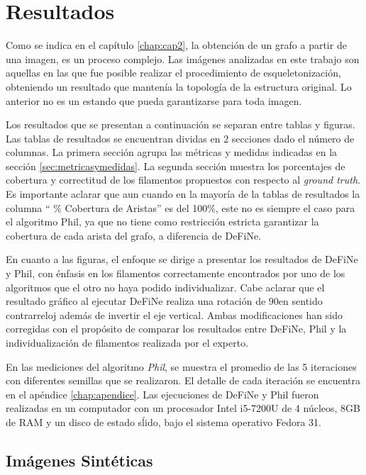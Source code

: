 \chapter{Resultados}
\label{chap:res}

Como se indica en el cap\'itulo \ref{chap:cap2}, la obtenci\'on de un grafo a partir de una imagen, es un proceso complejo. Las im\'agenes analizadas en este trabajo son aquellas en las que fue posible realizar el procedimiento de esqueletonizaci\'on, obteniendo un resultado que manten\'ia la topolog\'ia de la estructura original. Lo anterior no es un estando que pueda garantizarse para toda imagen. 


Los resultados que se presentan a continuaci\'on se separan entre tablas y figuras. Las tablas de resultados se encuentran dividas en 2 secciones dado el n\'umero de columnas. La primera secci\'on agrupa las m\'etricas y medidas indicadas en la secci\'on \ref{sec:metricasymedidas}. La segunda secci\'on muestra los porcentajes de cobertura y correctitud de los filamentos propuestos con respecto al {\it ground truth}. Es importante aclarar que aun cuando en la mayor\'ia de la tablas de resultados la columna `` \% Cobertura de Aristas'' es del 100\%, este no es siempre el caso para el algoritmo Phil, ya que no tiene como restricci\'on estricta garantizar la cobertura de cada arista del grafo, a diferencia de DeFiNe.

En cuanto a las figuras, el enfoque se dirige a presentar los resultados de DeFiNe y Phil, con \'enfasis en los filamentos correctamente encontrados por uno de los algoritmos que el otro no haya podido individualizar. Cabe aclarar que el resultado gr\'afico al ejecutar DeFiNe realiza una rotaci\'on de 90\textdegree en sentido contrarreloj adem\'as de invertir el eje vertical. Ambas modificaciones han sido corregidas con el prop\'osito de comparar los resultados entre DeFiNe, Phil y la individualizaci\'on de filamentos realizada por el experto.


En las mediciones del algoritmo {\it Phil}, se muestra el promedio de las 5 iteraciones con diferentes semillas que se realizaron. El detalle de cada iteraci\'on se encuentra en el ap\'endice \ref{chap:apendice}.
Las ejecuciones de DeFiNe y Phil fueron realizadas en un computador con un procesador {\sc Intel i5-7200U} de 4 n\'ucleos, 8GB de RAM y un disco de estado s\'lido, bajo el sistema operativo {\sc Fedora 31}.

\section{Im\'agenes Sint\'eticas}

